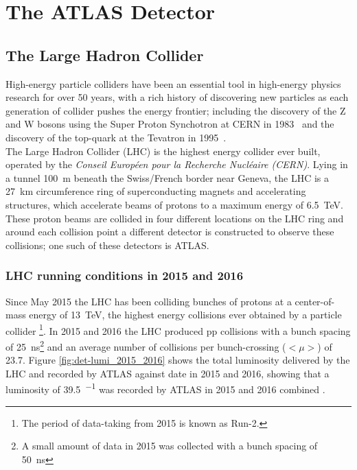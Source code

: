 \chapter{The ATLAS Detector}
\label{sec:det}

\section{The Large Hadron Collider}
\label{sec:det-LHC}

High-energy particle colliders have been an essential tool in high-energy physics research for over 50 years,
with a rich history of discovering new particles as each generation of collider pushes the energy frontier;
including the discovery of the Z and W bosons using the Super Proton Synchotron at CERN in 1983~\cite{det-Wdisc_UA1, det-Zdisc_UA1, det-Wdisc_UA2, det-Zdisc_UA2} 
and the discovery of the  top-quark at the Tevatron in 1995~\cite{det-tdisc_CDF, det-tdisc_D0}.\\

The Large Hadron Collider (LHC) is the highest energy collider ever built,
operated by the \textit{Conseil Europ\'een pour la Recherche Nucl\'eaire (CERN)}.
Lying in a tunnel \SI{100}{\metre} beneath the Swiss/French border near Geneva,
the LHC is a \SI{27}{\km} circumference ring of superconducting magnets and accelerating structures,
which accelerate beams of protons to a maximum energy of \SI{6.5}{\TeV}.
These proton beams are collided in four different locations on the LHC ring
and around each collision point a different detector is constructed to observe these collisions;
one such of these detectors is ATLAS.\\

\subsection{LHC running conditions in 2015 and 2016}

Since May 2015 the LHC has been colliding bunches of protons at a center-of-mass energy of \SI{13}{\TeV},
the highest energy collisions ever obtained by a particle collider
\footnote{The period of data-taking from 2015 is known as Run-2.}.
In 2015 and 2016 the LHC produced pp collisions 
with a bunch spacing of \SI{25}{\nano\second}\footnote{A small amount of data in 2015 was collected with a bunch spacing of \SI{50}{\nano\second}}
and an average number of collisions per bunch-crossing ($<\mu>$) of 23.7.
Figure \ref{fig:det-lumi_2015_2016} shows the total luminosity
delivered by the LHC and recorded by ATLAS against date in 2015 and 2016,
showing that a luminosity of \SI{39.5}{\fb^{-1}} was recorded by ATLAS in 2015 and 2016 combined \cite{det-ATLAS_lumi_twiki}.\\

